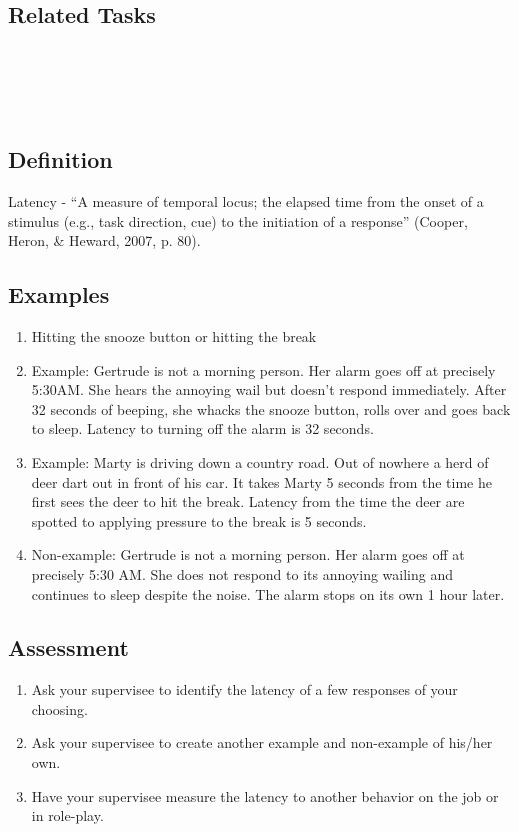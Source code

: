 \subsection{Related Tasks}
\fourhOne{}\\
\fouriOne{}\\
\fourFKFourtySeven{}\\
%
\clearpage \section{\fouraFour{}}
\subsection{Definition}  
Latency - ``A measure of temporal locus; the elapsed time from the onset of a stimulus (e.g., task direction, cue) to the initiation of a response'' (Cooper, Heron, \& Heward, 2007, p. 80).  

\subsection{Examples}
\begin{enumerate}
\item Hitting the snooze button or hitting the break
\item Example: Gertrude is not a morning person.  Her alarm goes off at precisely 5:30AM.  She hears the annoying wail but doesn't respond immediately.  After 32 seconds of beeping, she whacks the snooze button, rolls over and goes back to sleep.  Latency to turning off the alarm is 32 seconds.
\item Example:  Marty is driving down a country road.  Out of nowhere a herd of deer dart out in front of his car.  It takes Marty 5 seconds from the time he first sees the deer to hit the break.  Latency from the time the deer are spotted to applying pressure to the break is 5 seconds.    
\item Non-example: Gertrude is not a morning person.  Her alarm goes off at precisely 5:30 AM.  She does not respond to its annoying wailing and continues to sleep despite the noise.  The alarm stops on its own 1 hour later.
\end{enumerate}
%
\subsection{Assessment}
\begin{enumerate}
\item Ask your supervisee to identify the latency of a few responses of your choosing.  
\item Ask your supervisee to create another example and non-example of his/her own.
\item Have your supervisee measure the latency to another behavior on the job or in role-play.
\end{enumerate}
%
